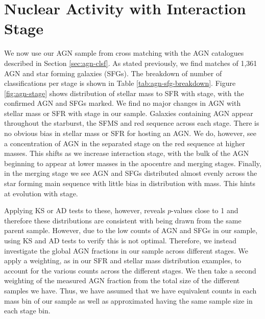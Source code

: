 \section{Nuclear Activity with Interaction Stage}\label{results:AGN_stage}
\noindent We now use our AGN sample from cross matching with the AGN catalogues described in Section \ref{sec:agn-clsf}. As stated previously, we find matches of 1,361 AGN and star forming galaxies (SFGs). The breakdown of number of classifications per stage is shown in Table \ref{tab:agn-sfg-breakdown}. Figure \ref{fig:agn-stage} shows distribution of stellar mass to SFR with stage, with the confirmed AGN and SFGs marked. We find no major changes in AGN with stellar mass or SFR with stage in our sample. Galaxies containing AGN appear throughout the starburst, the SFMS and red sequence across each stage. There is no obvious bias in stellar mass or SFR for hosting an AGN. We do, however, see a concentration of AGN in the separated stage on the red sequence at higher masses. This shifts as we increase interaction stage, with the bulk of the AGN beginning to appear at lower masses in the apocentre and merging stages. Finally, in the merging stage we see AGN and SFGs distributed almost evenly across the star forming main sequence with little bias in distribution with mass. This hints at evolution with stage.

Applying KS or AD tests to these, however, reveals $p$-values close to 1 and therefore these distributions are consistent with being drawn from the same parent sample. However, due to the low counts of AGN and SFGs in our sample, using KS and AD tests to verify this is not optimal. Therefore, we instead investigate the global AGN fractions in our sample across different stages. We apply a weighting, as in our SFR and stellar mass distribution examples, to account for the various counts across the different stages. We then take a second weighting of the measured AGN fraction from the total size of the different samples we have. Thus, we have assumed that we have equivalent counts in each mass bin of our sample as well as approximated having the same sample size in each stage bin.

